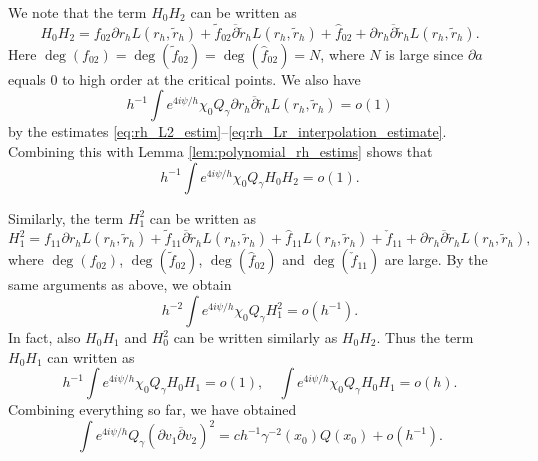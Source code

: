 \documentclass[12pt]{amsart}
\def\p{\partial}
\theoremstyle{definition}
\theoremstyle{remark}
\newcommand{\op}{\overline \p}
\begin{document}
We note that the term $H_0H_2$ can be written as
\[
 H_0H_2=f_{02}\p r_h L(r_h,\tilde r_h)+\tilde f_{02}\op \tilde r_h L(r_h,\tilde r_h)+\hat f_{02}+\p r_h\op \tilde r_hL(r_h,\tilde r_h).
\]
Here $\deg(f_{02})=\deg(\tilde f_{02})=\deg(\hat f_{02})=N$, where $N$ is large since $\p a$ equals $0$ to high order at the critical points. 
We also have
\[
 h^{-1}\int e^{4i\psi/h} \chi_0 Q_\gamma \p r_h\op \tilde r_hL(r_h,\tilde r_h)=o(1)
\]
by the estimates \eqref{eq:rh_L2_estim}--\eqref{eq:rh_Lr_interpolation_estimate}. Combining this with Lemma \ref{lem:polynomial_rh_estims} shows that
\[
 h^{-1}\int e^{4i\psi/h} \chi_0 Q_\gamma H_0H_2=o(1).
\]

Similarly, the term $H_1^2$ can be written as 
\[
 H_1^2=f_{11}\p r_h L(r_h,\tilde r_h)+\tilde f_{11}\op \tilde r_h  L(r_h,\tilde r_h)+\hat f_{11}L(r_h,\tilde r_h)+\check f_{11}+\p r_h\op \tilde r_hL(r_h,\tilde r_h),
\]
where $\deg(f_{02})$, $\deg(\tilde f_{02})$, $\deg(\hat f_{02})$ and $\deg(\check f_{11})$ are large. By the same arguments as above, we obtain
\[
 h^{-2}\int e^{4i\psi/h} \chi_0 Q_\gamma H_1^2=o(h^{-1}).
\]
In fact, also $H_0H_1$ and $H_0^2$ can be written similarly as $H_0H_2$. Thus the term $H_0H_1$ can written as
\[
 h^{-1}\int e^{4i\psi/h} \chi_0 Q_\gamma H_0H_1=o(1), \quad \int e^{4i\psi/h} \chi_0 Q_\gamma H_0H_1=o(h).
\]
Combining everything so far, we have obtained
\[
 \int e^{4i\psi/h} Q_\gamma(\p v_1\overline \p v_2)^2=ch^{-1}\gamma^{-2}(x_0)Q(x_0)+o(h^{-1}).
\]






% 
\end{document}
